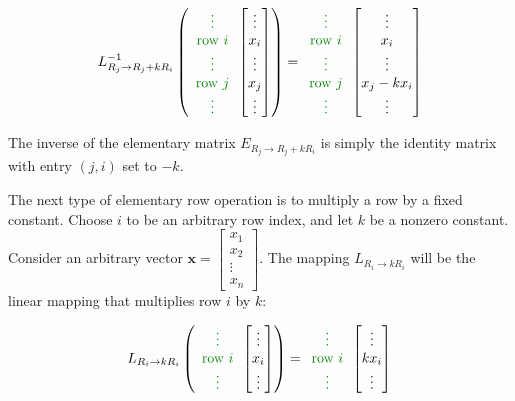 \documentclass{article}
\newcommand{\dg}[1]{\textcolor{dark_green}{#1}}
\begin{document}
\[L_{R_j \rightarrow R_j + kR_i}^{-1}\left(\dg{\begin{array}{c} \vdots \\ \text{row \(i\)} \\ \vdots \\ \text{row \(j\)} \\ \vdots \end{array}}\begin{bmatrix} \vdots \\ x_i \\ \vdots \\ x_j \\ \vdots \end{bmatrix}\right) = \dg{\begin{array}{c} \vdots \\ \text{row \(i\)} \\ \vdots \\ \text{row \(j\)} \\ \vdots \end{array}}\begin{bmatrix} \vdots \\ x_i \\ \vdots \\ x_j - k x_i \\ \vdots \end{bmatrix}\]

The inverse of the elementary matrix \(E_{R_j \rightarrow R_j + kR_i}\) is simply the identity matrix with entry \((j, i)\) set to \(-k\).

\vspace{1cm}

The next type of elementary row operation is to multiply a row by a fixed constant. Choose \(i\) to be an arbitrary row index, and let \(k\) be a nonzero constant. Consider an arbitrary vector \(\mathbf{x} = \begin{bmatrix} x_1 \\ x_2 \\ \vdots \\ x_n \end{bmatrix}\). The mapping \(L_{R_i \rightarrow kR_i}\) will be the linear mapping that multiplies row \(i\) by \(k\):

\[L_{R_i \rightarrow kR_i}\left(\dg{\begin{array}{c} \vdots \\ \text{row \(i\)} \\ \vdots \end{array}}\begin{bmatrix} \vdots \\ x_i \\ \vdots \end{bmatrix}\right) = \dg{\begin{array}{c} \vdots \\ \text{row \(i\)} \\ \vdots \end{array}}\begin{bmatrix} \vdots \\ k x_i \\ \vdots \end{bmatrix}\]
\end{document}
